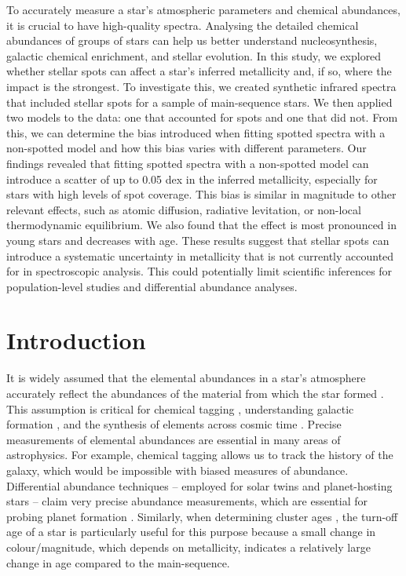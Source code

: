 To accurately measure a star's atmospheric parameters and chemical abundances, it is crucial to have high-quality spectra. Analysing the detailed chemical abundances of groups of stars can help us better understand nucleosynthesis, galactic chemical enrichment, and stellar evolution. In this study, we explored whether stellar spots can affect a star's inferred metallicity and, if so, where the impact is the strongest. To investigate this, we created synthetic infrared spectra that included stellar spots for a sample of main-sequence stars. We then applied two models to the data: one that accounted for spots and one that did not. From this, we can determine the bias introduced when fitting spotted spectra with a non-spotted model and how this bias varies with different parameters. Our findings revealed that fitting spotted spectra with a non-spotted model can introduce a scatter of up to 0.05 dex in the inferred metallicity, especially for stars with high levels of spot coverage. This bias is similar in magnitude to other relevant effects, such as atomic diffusion, radiative levitation, or non-local thermodynamic equilibrium. We also found that the effect is most pronounced in young stars and decreases with age. These results suggest that stellar spots can introduce a systematic uncertainty in metallicity that is not currently accounted for in spectroscopic analysis. This could potentially limit scientific inferences for population-level studies and differential abundance analyses.

\section{Introduction}
\label{sec:intro}

It is widely assumed that the elemental abundances in a star's atmosphere accurately reflect the abundances of the material from which the star formed \citep{gibson_galactic_2003,pagel_nucleosynthesis_2009,salaris_chemical_2017}. This assumption is critical for chemical tagging \citep{anders_galactic_2016, randich_gaia-eso_2022}, understanding galactic formation \citep{gibson_galactic_2003}, and the synthesis of elements across cosmic time \citep{mcwilliam_origin_2004,johnson_origin_2020}. Precise 
measurements of elemental abundances are essential in many areas of astrophysics. For example, chemical tagging allows us to track the history of the galaxy, which would be impossible with biased measures of abundance. Differential abundance techniques \citep{reggiani_first_2016} -- employed for solar twins and planet-hosting stars -- claim very precise abundance measurements, which are essential for probing planet formation \citep{tayar_guide_2022}. Similarly, when determining cluster ages \citep{bensby_possible_2004, pont_isochrone_2004}, the turn-off age of a star is particularly useful for this purpose because a small change in colour/magnitude, which depends on metallicity, indicates a relatively large change in age compared to the main-sequence.

